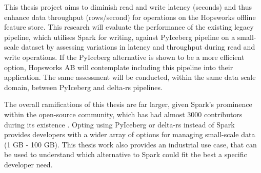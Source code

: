 This thesis project aims to diminish read and write latency (seconds) and thus enhance data throughput (rows/second) for operations on the Hopsworks offline feature store. This research will evaluate the performance of the existing legacy pipeline, which utilises Spark for writing, against PyIceberg pipeline on a small-scale dataset by assessing variations in latency and throughput during read and write operations. If the PyIceberg alternative is shown to be a more efficient option, Hopsworks AB will contemplate including this pipeline into their application. The same assessment will be conducted, within the same data scale domain, between PyIceberg and delta-rs pipelines.

The overall ramifications of this thesis are far larger, given Spark's prominence within the open-source community, which has had almost 3000 contributors during its existence \cite{ApacheSparkOpen}. Opting using PyIceberg or delta-rs instead of Spark provides developers with a wider array of options for managing small-scale data (1 GB - 100 GB). This thesis work also provides an industrial use case, that can be used to understand which alternative to Spark could fit the best a specific developer need.